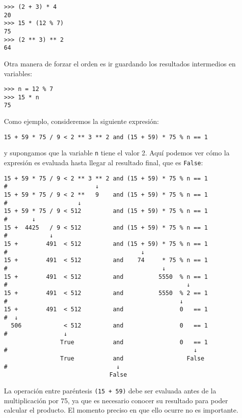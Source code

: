 \begin{lstlisting}
>>> (2 + 3) * 4
20
>>> 15 * (12 % 7)
75
>>> (2 ** 3) ** 2
64
\end{lstlisting}

Otra manera de forzar el orden es ir guardando los resultados
intermedios en variables:

\begin{lstlisting}
>>> n = 12 % 7
>>> 15 * n
75
\end{lstlisting}

Como ejemplo, consideremos la siguiente expresión:

\begin{lstlisting}
15 + 59 * 75 / 9 < 2 ** 3 ** 2 and (15 + 59) * 75 % n == 1
\end{lstlisting}

y supongamos que la variable \lstinline!n! tiene el valor 2. Aquí
podemos ver cómo la expresión es evaluada hasta llegar al resultado
final, que es \lstinline!False!:

\begin{lstlisting}
15 + 59 * 75 / 9 < 2 ** 3 ** 2 and (15 + 59) * 75 % n == 1
#                         ↓
15 + 59 * 75 / 9 < 2 **   9    and (15 + 59) * 75 % n == 1
#                    ↓
15 + 59 * 75 / 9 < 512         and (15 + 59) * 75 % n == 1
#       ↓
15 +  4425   / 9 < 512         and (15 + 59) * 75 % n == 1
#            ↓
15 +        491  < 512         and (15 + 59) * 75 % n == 1
#                                      ↓
15 +        491  < 512         and    74     * 75 % n == 1
#                                            ↓
15 +        491  < 512         and          5550  % n == 1
#                                                   ↓
15 +        491  < 512         and          5550  % 2 == 1
#                                                 ↓
15 +        491  < 512         and                0   == 1
#  ↓
  506            < 512         and                0   == 1
#                ↓
                True           and                0   == 1
#                                                     ↓
                True           and                  False
#                               ↓
                              False
\end{lstlisting}

La operación entre paréntesis \lstinline!(15 + 59)! debe ser evaluada
antes de la multiplicación por 75, ya que es necesario conocer su
resultado para poder calcular el producto. El momento preciso en que
ello ocurre no es importante.

